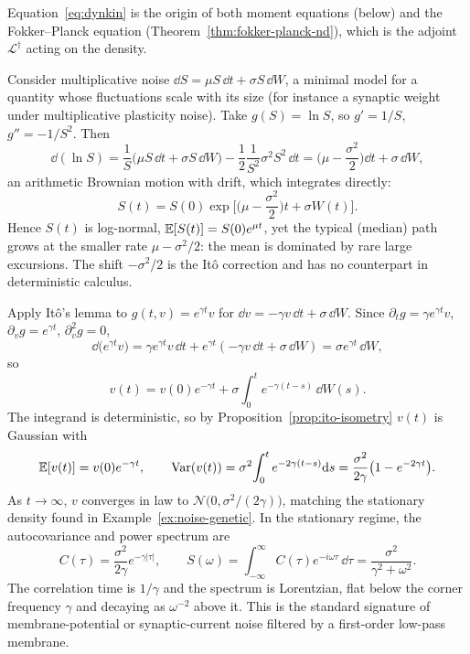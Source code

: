 Equation~\eqref{eq:dynkin} is the origin of both moment equations (below) and the Fokker--Planck equation (Theorem~\ref{thm:fokker-planck-nd}), which is the adjoint $\mathcal L^{\dagger}$ acting on the density.

\begin{example}
\label{ex:gbm}
Consider multiplicative noise $\dd S=\mu S\,\dd t+\sigma S\,\dd W$, a minimal model for a quantity whose fluctuations scale with its size (for instance a synaptic weight under multiplicative plasticity noise). Take $g(S)=\ln S$, so $g'=1/S$, $g''=-1/S^2$. Then
\[
\dd(\ln S)=\frac{1}{S}\big(\mu S\,\dd t+\sigma S\,\dd W\big)-\frac12\frac{1}{S^2}\sigma^2S^2\,\dd t=\Big(\mu-\frac{\sigma^2}{2}\Big)\dd t+\sigma\,\dd W,
\]
an arithmetic Brownian motion with drift, which integrates directly:
\[
S(t)=S(0)\exp\!\Big[\Big(\mu-\frac{\sigma^2}{2}\Big)t+\sigma W(t)\Big].
\]
Hence $S(t)$ is log-normal, $\operatorname{\mathbb{E}}[S(t)]=S(0)e^{\mu t}$, yet the typical (median) path grows at the smaller rate $\mu-\sigma^2/2$: the mean is dominated by rare large excursions. The shift $-\sigma^2/2$ is the It\^o correction and has no counterpart in deterministic calculus.
\end{example}

\begin{example}
\label{ex:ou-solution}
Apply It\^o's lemma to $g(t,v)=e^{\gamma t}v$ for $\dd v=-\gamma v\,\dd t+\sigma\,\dd W$. Since $\partial_t g=\gamma e^{\gamma t}v$, $\partial_vg=e^{\gamma t}$, $\partial_v^2g=0$,
\[
\dd\big(e^{\gamma t}v\big)=\gamma e^{\gamma t}v\,\dd t+e^{\gamma t}(-\gamma v\,\dd t+\sigma\,\dd W)=\sigma e^{\gamma t}\,\dd W,
\]
so
\[
v(t)=v(0)e^{-\gamma t}+\sigma\int_0^te^{-\gamma(t-s)}\,\dd W(s).
\]
The integrand is deterministic, so by Proposition~\ref{prop:ito-isometry} $v(t)$ is Gaussian with
\[
\operatorname{\mathbb{E}}[v(t)]=v(0)e^{-\gamma t},\qquad \operatorname{Var}(v(t))=\sigma^2\!\int_0^te^{-2\gamma(t-s)}\mathrm{d} s=\frac{\sigma^2}{2\gamma}\big(1-e^{-2\gamma t}\big).
\]
As $t\to\infty$, $v$ converges in law to $\mathcal N\!\big(0,\sigma^2/(2\gamma)\big)$, matching the stationary density found in Example~\ref{ex:noise-genetic}. In the stationary regime, the autocovariance and power spectrum are
\begin{equation}
\label{eq:ou-autocov}
C(\tau)=\frac{\sigma^2}{2\gamma}e^{-\gamma|\tau|},\qquad
S(\omega)=\int_{-\infty}^{\infty}C(\tau)e^{-i\omega\tau}\,\dd\tau=\frac{\sigma^2}{\gamma^2+\omega^2}.
\end{equation}
The correlation time is $1/\gamma$ and the spectrum is Lorentzian, flat below the corner frequency $\gamma$ and decaying as $\omega^{-2}$ above it. This is the standard signature of membrane-potential or synaptic-current noise filtered by a first-order low-pass membrane.
\end{example}

